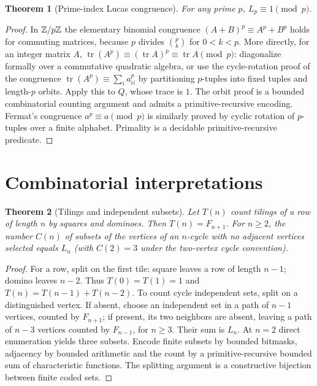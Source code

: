 \documentclass[11pt]{article}
\newtheorem{theorem}{Theorem}[section]
\begin{document}
\begin{theorem}[Prime-index Lucas congruence]
For any prime $p$, $L_p\equiv1\pmod p$.
\end{theorem}
\begin{proof}
In $\mathbb Z/p\mathbb Z$ the elementary binomial congruence $(A+B)^p\equiv A^p+B^p$ holds for commuting matrices, because $p$ divides $\binom pk$ for $0<k<p$. More directly, for an integer matrix $A$, $\operatorname{tr}(A^p)\equiv (\operatorname{tr}A)^p\equiv\operatorname{tr}A\pmod p$: diagonalize formally over a commutative quadratic algebra, or use the cycle-rotation proof of the congruence $\operatorname{tr}(A^p)\equiv\sum_i a_{ii}^p$ by partitioning $p$-tuples into fixed tuples and length-$p$ orbits. Apply this to $Q$, whose trace is $1$. The orbit proof is a bounded combinatorial counting argument and admits a primitive-recursive encoding. Fermat's congruence $a^p\equiv a\pmod p$ is similarly proved by cyclic rotation of $p$-tuples over a finite alphabet. Primality is a decidable primitive-recursive predicate.
\end{proof}
\section{Combinatorial interpretations}
\begin{theorem}[Tilings and independent subsets]
Let $T(n)$ count tilings of a row of length $n$ by squares and dominoes. Then $T(n)=F_{n+1}$. For $n\ge2$, the number $C(n)$ of subsets of the vertices of an $n$-cycle with no adjacent vertices selected equals $L_n$ (with $C(2)=3$ under the two-vertex cycle convention).\end{theorem}
\begin{proof}
For a row, split on the first tile: square leaves a row of length $n-1$; domino leaves $n-2$. Thus $T(0)=T(1)=1$ and $T(n)=T(n-1)+T(n-2)$. To count cycle independent sets, split on a distinguished vertex. If absent, choose an independent set in a path of $n-1$ vertices, counted by $F_{n+1}$; if present, its two neighbors are absent, leaving a path of $n-3$ vertices counted by $F_{n-1}$, for $n\ge3$. Their sum is $L_n$. At $n=2$ direct enumeration yields three subsets. Encode finite subsets by bounded bitmasks, adjacency by bounded arithmetic and the count by a primitive-recursive bounded sum of characteristic functions. The splitting argument is a constructive bijection between finite coded sets.
\end{proof}
\end{document}
